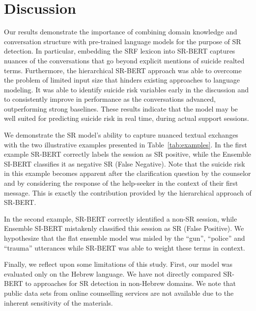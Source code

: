 \documentclass[letterpaper]{article} %
\begin{document}
\section{Discussion}
Our results demonstrate the importance of combining domain knowledge and conversation structure with pre-trained language models for the purpose of SR detection.
In particular, embedding the SRF lexicon into SR-BERT captures nuances of the conversations that go beyond explicit mentions of suicide realted terms.
Furthermore, the  hierarchical SR-BERT approach was able to overcome the problem of limited input size that hinders existing approaches to language modeling.  It was able to identify suicide risk variables early in the discussion and to consistently improve in performance as the conversations advanced, outperforming strong baselines.    These  results indicate that the model may be well suited for predicting suicide risk in real time, during actual support sessions.

We demonstrate the SR model's ability to capture nuanced textual exchanges with the two  illustrative examples presented in Table~\ref{tab:examples}. In the first example  SR-BERT correctly labels the session as SR positive, while the Ensemble SI-BERT classifies it as negative SR (False Negative).
Note that the suicide risk in this example becomes apparent after the clarification question by the counselor and by considering the response of the help-seeker in the context of their first message.
This is exactly the  contribution provided by the hierarchical approach of SR-BERT.

In the second example, SR-BERT correctly identified a non-SR session, while Ensemble SI-BERT mistakenly classified this session as SR (False Positive). We hypothesize that the flat ensemble model was misled by the ``gun'', ``police'' and ``trauma'' utterances while SR-BERT was able to weight these terms in context.

Finally, we  reflect upon some limitations of this study. First, our model was evaluated only on the Hebrew language. We have not directly compared SR-BERT to  approaches for SR detection in non-Hebrew domains.  We note that public data sets from online counselling services  are not available due to the inherent sensitivity of the materials.
\end{document}
